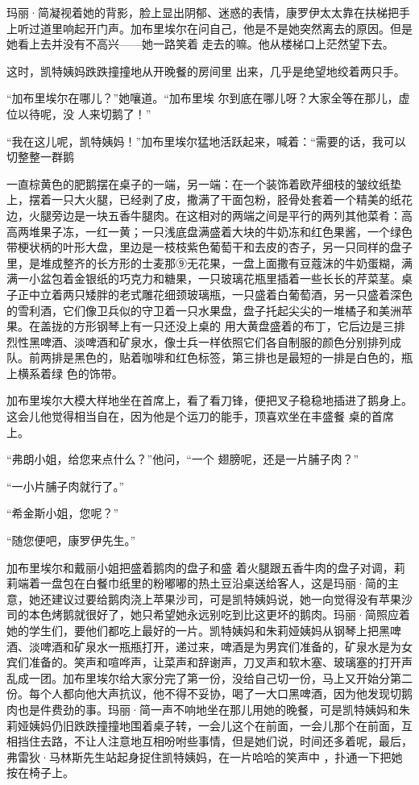 \documentclass{article}
\begin{document}
玛丽·简凝视着她的背影，脸上显出阴郁、迷惑的表情，康罗伊太太靠在扶梯把手上听过道里响起开门声。加布里埃尔在问自己，他是不是她突然离去的原因。但是她看上去并没有不高兴——她一路笑着
走去的嘛。他从楼梯口上茫然望下去。 

这时，凯特姨妈跌跌撞撞地从开晚餐的房间里
出来，几乎是绝望地绞着两只手。 

“加布里埃尔在哪儿？”她嚷道。“加布里埃
\newpage
尔到底在哪儿呀？大家全等在那儿，虚位以待呢，没
人来切鹅了！” 

“我在这儿呢，凯特姨妈！”加布里埃尔猛地活跃起来，喊着：“需要的话，我可以切整整一群鹅

一直棕黄色的肥鹅摆在桌子的一端，另一端：在一个装饰着欧芹细枝的皱纹纸垫上，摆着一只大火腿，已经剥了皮，撒满了干面包粉，胫骨处套着一个精美的纸花边，火腿旁边是一块五香牛腿肉。在这相对的两端之间是平行的两列其他菜肴：高高两堆果子冻，一红一黄；一只浅底盘满盛着大块的牛奶冻和红色果酱，一个绿色带梗状柄的叶形大盘，里边是一枝枝紫色葡萄干和去皮的杏子，另一只同样的盘子里，是堆成整齐的长方形的士麦那⑨无花果，一盘上面撒有豆蔻沫的牛奶蛋糊，满满一小盆包着金银纸的巧克力和糖果，一只玻璃花瓶里插着一些长长的芹菜茎。桌子正中立着两只矮胖的老式雕花细颈玻璃瓶，一只盛着白葡萄酒，另一只盛着深色的雪利酒，它们像卫兵似的守卫着一只水果盘，盘子托起尖尖的一堆橘子和美洲苹果。在盖拢的方形钢琴上有一只还没上桌的
\newpage
用大黄盘盛着的布丁，它后边是三排烈性黑啤酒、淡啤酒和矿泉水，像士兵一样依照它们各自制服的颜色分别排列成队。前两排是黑色的，贴着咖啡和红色标签，第三排也是最短的一排是白色的，瓶上横系着绿
色的饰带。 

加布里埃尔大模大样地坐在首席上，看了看刀锋，便把叉子稳稳地插进了鹅身上。这会儿他觉得相当自在，因为他是个运刀的能手，顶喜欢坐在丰盛餐
桌的首席上。 

“弗朗小姐，给您来点什么？”他问，“一个
翅膀呢，还是一片脯子肉？” 


“一小片脯子肉就行了。” 


“希金斯小姐，您呢？” 


“随您便吧，康罗伊先生。” 

加布里埃尔和戴丽小姐把盛着鹅肉的盘子和盛
\newpage
着火腿跟五香牛肉的盘子对调，莉莉端着一盘包在白餐巾纸里的粉嘟嘟的热土豆沿桌送给客人，这是玛丽·简的主意，她还建议过要给鹅肉浇上苹果沙司，可是凯特姨妈说，她一向觉得没有苹果沙司的本色烤鹅就很好了，她只希望她永远别吃到比这更坏的鹅肉。玛丽·简照应着她的学生们，要他们都吃上最好的一片。凯特姨妈和朱莉娅姨妈从钢琴上把黑啤酒、淡啤酒和矿泉水一瓶瓶打开，递过来，啤酒是为男宾们准备的，矿泉水是为女宾们准备的。笑声和喧哗声，让菜声和辞谢声，刀叉声和软木塞、玻璃塞的打开声乱成一团。加布里埃尔给大家分完了第一份，没给自己切一份，马上又开始分第二份。每个人都向他大声抗议，他不得不妥协，喝了一大口黑啤酒，因为他发现切鹅肉也是件费劲的事。玛丽·简一声不响地坐在那儿用她的晚餐，可是凯特姨妈和朱莉娅姨妈仍旧跌跌撞撞地围着桌子转，一会儿这个在前面，一会儿那个在前面，互相挡住去路，不让人注意地互相吩咐些事情，但是她们说，时间还多着呢，最后，弗雷狄·马林斯先生站起身捉住凯特姨妈，在一片哈哈的笑声中
，扑通一下把她按在椅子上。 
\end{document}

